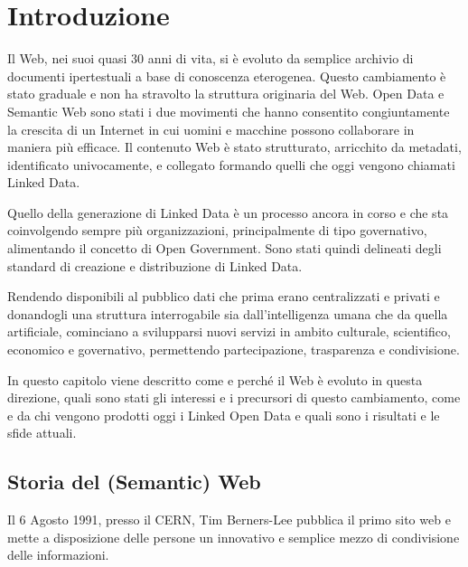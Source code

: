 %
\chapter{Introduzione}
\label{sec:intro}

Il Web, nei suoi quasi 30 anni di vita, si è evoluto da semplice archivio di documenti ipertestuali a base di conoscenza eterogenea. Questo cambiamento è stato graduale e non ha stravolto la struttura originaria del Web. Open Data e Semantic Web sono stati i due movimenti che hanno consentito congiuntamente la crescita di un Internet in cui uomini e macchine possono collaborare in maniera più efficace. Il contenuto Web è stato strutturato, arricchito da metadati, identificato univocamente, e collegato formando quelli che oggi vengono chiamati Linked Data.

Quello della generazione di Linked Data è un processo ancora in corso e che sta coinvolgendo sempre più organizzazioni, principalmente di tipo governativo, alimentando il concetto di Open Government. Sono stati  quindi delineati degli standard di creazione e distribuzione di Linked Data. 

Rendendo disponibili al pubblico dati che prima erano centralizzati e privati e donandogli una struttura interrogabile sia dall'intelligenza umana che da quella artificiale, cominciano a svilupparsi nuovi servizi in ambito culturale, scientifico, economico e governativo, permettendo partecipazione, trasparenza e condivisione.

In questo capitolo viene descritto come e perché il Web è evoluto in questa direzione, quali sono stati gli interessi e i precursori di questo cambiamento, come e da chi vengono prodotti oggi i Linked Open Data e quali sono i risultati e le sfide attuali.



\section{Storia del (Semantic) Web}
\label{sec:intro:web_history}

 
Il 6 Agosto 1991, presso il CERN, Tim Berners-Lee pubblica il primo sito web e mette a disposizione delle persone un innovativo e semplice mezzo di condivisione delle informazioni. 

